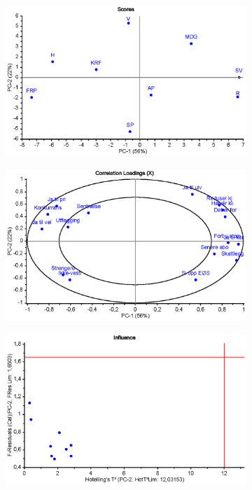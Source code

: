 \begin{figure}[h]
 	\centering
 	\begin{subfigure}[t]{0.48\textwidth}
 		\centering
 		\includegraphics[width=\textwidth]{figurer/politikk-pca-scores}
 		\caption{}
 		\label{}
 	\end{subfigure}	
 	\begin{subfigure}[t]{0.48\textwidth}
 		\centering
 		\includegraphics[width=\textwidth]{figurer/politikk-pca-loadings}
 		\caption{}
 		\label{}
 	\end{subfigure}
 	\begin{subfigure}[t]{0.48\textwidth}
 		\centering
 		\includegraphics[width=\textwidth]{figurer/politikk-pca-influence}

\end{subfigure}
\end{figure}
